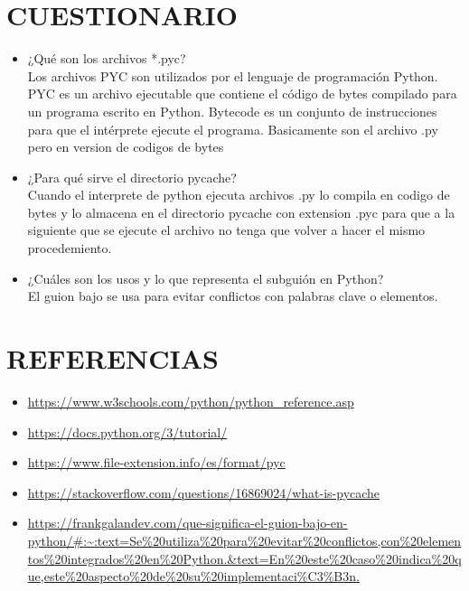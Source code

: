\documentclass{article}
\begin{document}
\section{CUESTIONARIO}

\begin{itemize}
    \item ¿Qué son los archivos *.pyc?  \\
    Los archivos PYC son utilizados por el lenguaje de programación Python. PYC es un archivo ejecutable que contiene el código de bytes compilado para un programa escrito en Python. Bytecode es un conjunto de instrucciones para que el intérprete ejecute el programa. Basicamente son el archivo .py pero en version de codigos de bytes
    
    \item ¿Para qué sirve el directorio pycache? \\
    Cuando el interprete de python ejecuta archivos .py lo compila en codigo de bytes y lo almacena en el directorio pycache con extension .pyc para que a la siguiente que se ejecute el archivo no tenga que volver a hacer el mismo procedemiento. 
    
    \item ¿Cuáles son los usos y lo que representa el subguión en Python? \\
    El guion bajo se usa para evitar conflictos con palabras clave o elementos.
    
\end{itemize}

\section{REFERENCIAS}

\begin{itemize}
    \item \url {https://www.w3schools.com/python/python_reference.asp} \\ 
    \item \url{https://docs.python.org/3/tutorial/}\item \url{https://www.file-extension.info/es/format/pyc}
    \item \url{https://stackoverflow.com/questions/16869024/what-is-pycache}
    \item \url{https://frankgalandev.com/que-significa-el-guion-bajo-en-python/#:~:text=Se%20utiliza%20para%20evitar%20conflictos,con%20elementos%20integrados%20en%20Python.&text=En%20este%20caso%20indica%20que,este%20aspecto%20de%20su%20implementaci%C3%B3n.}
\end{itemize}
\end{document}
